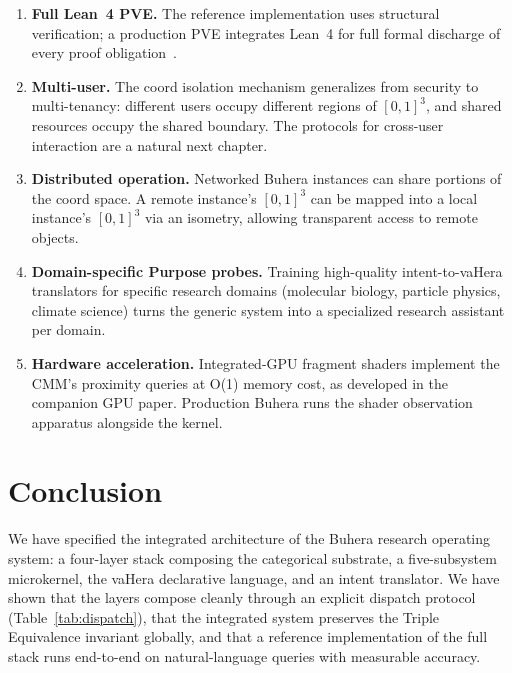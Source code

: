 \documentclass[11pt,twocolumn,a4paper]{article}
\begin{document}
\begin{enumerate}[leftmargin=*]
\item \textbf{Full Lean~4 PVE.} The reference implementation uses structural verification; a production PVE integrates Lean~4 for full formal discharge of every proof obligation~\cite{demoura2015lean,moura2021lean4}.

\item \textbf{Multi-user.} The coord isolation mechanism generalizes from security to multi-tenancy: different users occupy different regions of $[0,1]^3$, and shared resources occupy the shared boundary. The protocols for cross-user interaction are a natural next chapter.

\item \textbf{Distributed operation.} Networked Buhera instances can share portions of the coord space. A remote instance's $[0,1]^3$ can be mapped into a local instance's $[0,1]^3$ via an isometry, allowing transparent access to remote objects.

\item \textbf{Domain-specific Purpose probes.} Training high-quality intent-to-vaHera translators for specific research domains (molecular biology, particle physics, climate science) turns the generic system into a specialized research assistant per domain.

\item \textbf{Hardware acceleration.} Integrated-GPU fragment shaders implement the CMM's proximity queries at O(1) memory cost, as developed in the companion GPU paper. Production Buhera runs the shader observation apparatus alongside the kernel.
\end{enumerate}


\section{Conclusion}
\label{sec:conclusion}

We have specified the integrated architecture of the Buhera research operating system: a four-layer stack composing the categorical substrate, a five-subsystem microkernel, the vaHera declarative language, and an intent translator. We have shown that the layers compose cleanly through an explicit dispatch protocol (Table~\ref{tab:dispatch}), that the integrated system preserves the Triple Equivalence invariant globally, and that a reference implementation of the full stack runs end-to-end on natural-language queries with measurable accuracy.
\end{document}
